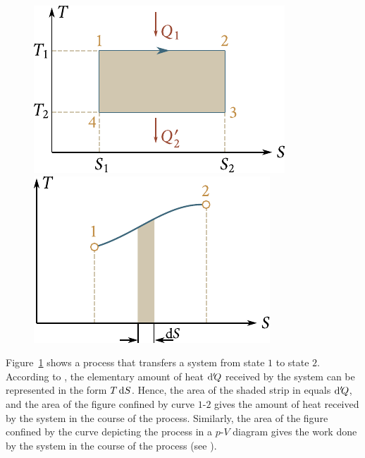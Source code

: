 \begin{figure}[t]
	\begin{minipage}[t]{0.5\linewidth}
		\begin{center}
			\includegraphics[scale=1.0]{figures/ch_12/fig_12_2.pdf}
			\caption[]{}
			\label{fig:12_2}
		\end{center}
	\end{minipage}
	\hspace{-0.05cm}
	\begin{minipage}[t]{0.5\linewidth}
		\begin{center}
			\includegraphics[scale=1.0]{figures/ch_12/fig_12_3.pdf}
			\caption[]{}
			\label{fig:12_3}
		\end{center}
	\end{minipage}
	\vspace{-0.4cm}
\end{figure}

Figure~\ref{fig:12_3} shows a process that transfers a system from state $1$ to state $2$. According to , the elementary amount of heat $\mathrm{d}'\!Q$ received by the system can be represented in the form $T\,\mathrm{d} S$. Hence, the area of the shaded strip in  equals $\mathrm{d}'\!Q$, and the area of the figure confined by curve $1$-$2$ gives the amount of heat received by the system in the course of the process. Similarly, the area of the figure confined by the curve depicting the process in a $p$-$V$ diagram gives the work done by the system in the course of the process (see ).

